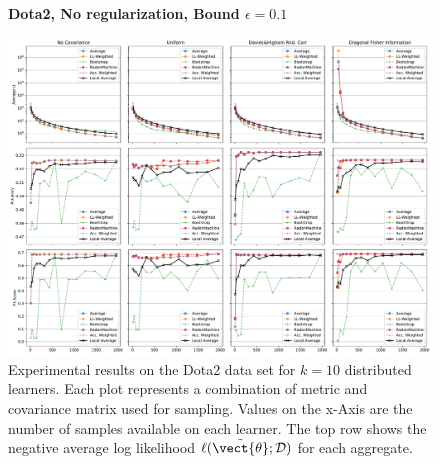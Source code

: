 \begin{landscape}
    \begin{figure}
        \centering
        \textbf{Dota2, No regularization, Bound $\epsilon=0.1$}\par\medskip
        \includegraphics[height=\dimexpr \textheight - 4\baselineskip\relax]{kapitel/figures/dota2_None_0.1.pdf}
        \caption[Dota2 plots without regularization and $\epsilon=0.1$]{Experimental results on the Dota2 data set for $k=10$ distributed learners. Each plot represents a combination of metric and covariance matrix used for sampling. Values on the x-Axis are the number of samples available on each learner. The top row shows the negative average log likelihood $\ell(\tilde{\vect{\theta}}; \mathcal{D})$ for each aggregate.}
        \label{fig:analysis10}
    \end{figure}
    \end{landscape}
